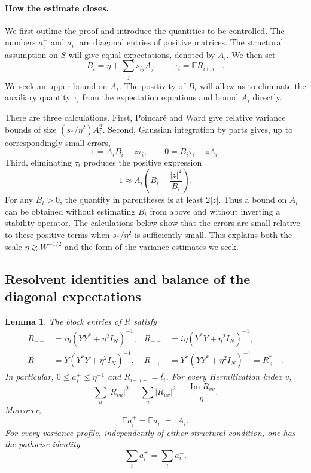 \documentclass[11pt,reqno]{amsart}
\numberwithin{equation}{section}
\theoremstyle{plain}
\newtheorem{lemma}[theorem]{Lemma}
\theoremstyle{definition}
\theoremstyle{remark}
\begin{document}
\paragraph{How the estimate closes.}
We first outline the proof and introduce the quantities to be
controlled. The numbers $a_i^+$ and $a_i^-$ are diagonal entries of
positive matrices. The structural assumption on $S$ will give equal
expectations, denoted by $A_i$. We then set
\[
 B_i=\eta+\sum_j s_{ij}A_j,\qquad \tau_i=\mathbb E R_{i+,i-}.
\]
We seek an upper bound on $A_i$. The positivity of $B_i$ will allow us
to eliminate the auxiliary quantity $\tau_i$ from the expectation
equations and bound $A_i$ directly.

There are three calculations. First, Poincar\'e and Ward give relative
variance bounds of size $(s_*/\eta^2)A_i^2$. Second, Gaussian integration
by parts gives, up to correspondingly small errors,
\[
 1=A_iB_i-z\overline{\tau_i},\qquad
 0=B_i\tau_i+zA_i.
\]
Third, eliminating $\tau_i$ produces the positive expression
\[
 1\approx A_i\left(B_i+\frac{|z|^2}{B_i}\right).
\]
For any $B_i>0$, the quantity in parentheses is at least $2|z|$.
Thus a bound on $A_i$ can be obtained without estimating $B_i$ from
above and without inverting a stability operator. The calculations below
show that the errors are small relative to these positive terms when
$s_*/\eta^2$ is sufficiently small. This explains both the scale
$\eta\gtrsim W^{-1/2}$ and the form of the variance estimates we seek.

\subsection{Resolvent identities and balance of the diagonal expectations}

\begin{lemma}\label{lem:coarse-ward}
The block entries of $R$ satisfy
\begin{align}
 R_{++}&=i\eta(YY^*+\eta^2I_N)^{-1},&
 R_{--}&=i\eta(Y^*Y+\eta^2I_N)^{-1},
 \label{eq:coarse-diagonal-blocks}\\
 R_{+-}&=Y(Y^*Y+\eta^2I_N)^{-1},&
 R_{-+}&=Y^*(YY^*+\eta^2I_N)^{-1}=R_{+-}^*.
 \label{eq:coarse-offdiagonal-blocks}
\end{align}
In particular, $0\le a_i^\pm\le\eta^{-1}$ and
$R_{i-,i+}=\overline{t_i}$.  For every Hermitization index $v$,
\begin{equation}\label{eq:coarse-ward}
 \sum_u|R_{vu}|^2=\sum_u|R_{uv}|^2
 =\frac{\operatorname{Im}R_{vv}}{\eta}.
\end{equation}
Moreover,
\begin{equation}\label{eq:coarse-transpose-means}
 \mathbb E a_i^+=\mathbb E a_i^-=:A_i.
\end{equation}
For every variance profile, independently of either structural condition,
one has the pathwise identity
\begin{equation}\label{eq:coarse-exact-trace-balance}
 \sum_i a_i^+=\sum_i a_i^-.
\end{equation}
\end{lemma}
\end{document}
